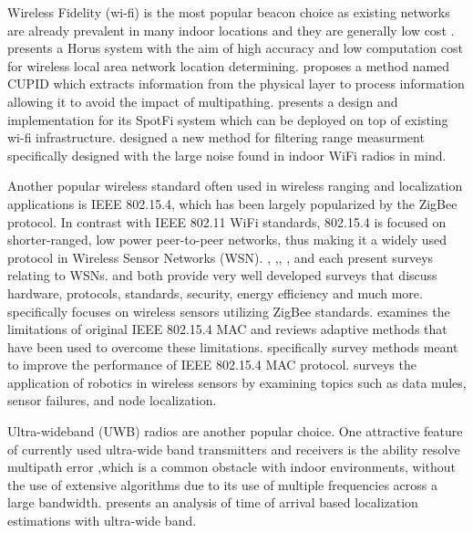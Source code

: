 \documentclass[conference]{IEEEtran}
\begin{document}
			Wireless Fidelity (wi-fi)  is the most popular beacon choice as existing networks are already prevalent in many indoor locations and they are generally low cost \cite{Youssef2005} \cite{Sen2013} \cite{Kotaru2015} \cite{Rea2017}. \cite{Youssef2005} presents a Horus system with the aim of high accuracy and low computation cost for wireless local area network location determining. \cite{Sen2013} proposes a method named CUPID which extracts information from the physical layer to process information allowing it to avoid the impact of multipathing. \cite{Kotaru2015} presents a design and implementation for its SpotFi system which can be deployed on top of existing wi-fi infrastructure. \cite{Rea2017} designed a new method for filtering range measurment specifically designed with the large noise found in indoor WiFi radios in mind. 

			 Another popular wireless standard often used in wireless ranging and localization applications is IEEE 802.15.4, which has been largely popularized by the ZigBee protocol. In contrast with IEEE 802.11 WiFi standards, 802.15.4 is focused on shorter-ranged, low power peer-to-peer networks, thus making it a widely used protocol in Wireless Sensor Networks (WSN).  \cite{Baronti2007}, \cite{Khanafer2014},\cite{Shue2013}, \cite{Akyildiz2002}, and \cite{Xia2011} each present surveys relating to WSNs. \cite{Baronti2007} and \cite{Akyildiz2002} both provide very well developed surveys that discuss hardware, protocols, standards, security, energy efficiency and much more. \cite{Baronti2007} specifically focuses on wireless sensors utilizing ZigBee standards. \cite{Xia2011} examines the limitations of original IEEE 802.15.4 MAC and reviews adaptive methods that have been used to overcome these limitations. \cite{Khanafer2014} specifically survey methods meant to improve the performance of IEEE 802.15.4 MAC protocol. \cite{Shue2013} surveys the application of robotics in wireless sensors by examining topics such as data mules, sensor failures, and node localization. 
			 
			 Ultra-wideband (UWB) radios are another popular choice. One attractive feature of currently used ultra-wide band transmitters and receivers is the ability resolve multipath error ,which is a common obstacle with indoor environments, without the use of extensive algorithms due to its use of multiple frequencies across a large bandwidth. \cite{Gezici2005} presents an analysis of time of arrival based localization estimations with ultra-wide band. 
\end{document}
